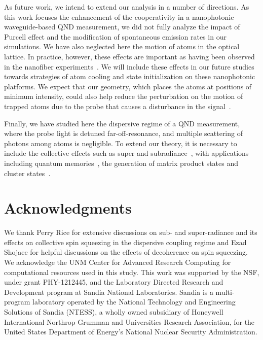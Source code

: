 \documentclass[aps,pra,twocolumn,superscriptaddress]{revtex4-1} %
\begin{document}
As future work, we intend to extend our analysis in a number of directions.  As this work focuses the enhancement of the cooperativity in a nanophotonic waveguide-based QND measurement, we did not fully analyze the impact of Purcell effect and the modification of spontaneous emission rates in our simulations.  We have also neglected here the motion of atoms in the optical lattice. In practice, however, these effects are important as having been observed in the nanofiber  experiments~\cite{Solano2017Dynamics, Solano2017Alignment, Beguin2017Observation, Solano2017Optical}.  We will include these effects in our future studies towards strategies of atom cooling and state initialization on these nanophotonic platforms. We expect that our geometry, which places the atoms at positions of minimum intensity, could also help reduce the perturbation on the motion of trapped atoms due to the probe that causes a disturbance in the signal~\cite{Solano2017Dynamics}.  

Finally, we have studied here the dispersive regime of a QND measurement, where the probe light is detuned far-off-resonance, and multiple scattering  of photons among atoms is negligible. To extend our theory, it is necessary to include the collective effects such as super and subradiance~\cite{Asenjo-Garcia2017Exponential, Asenjo-Garcia2017Atom, Solano2017Super}, with applications including quantum memories~\cite{Sayrin2015, Gouraud2015Demonstration},  the generation of matrix product states and cluster states~\cite{Economou2010, Lodahl2017Chiral, Schwartz2016Deterministic, Pichler2016Photonic, Pichler2017Photonic}.  


\section{Acknowledgments}
We thank Perry Rice for extensive discussions on sub- and super-radiance and its effects on collective spin squeezing in the dispersive coupling regime and Ezad Shojaee for helpful discussions on the effects of decoherence on spin squeezing. We  acknowledge the UNM Center for Advanced Research Computing for computational resources used in this study.
This work was supported by the NSF, under grant PHY-1212445, and the Laboratory Directed Research and Development program at Sandia National Laboratories. Sandia is a multi-program laboratory operated by the National Technology and Engineering Solutions of Sandia (NTESS), a wholly owned subsidiary of Honeywell International Northrop Grumman and Universities Research Association, for the United States Department of Energy’s National Nuclear Security Administration.
\end{document}
